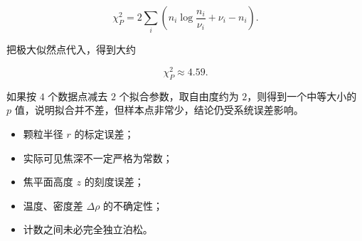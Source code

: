 \begin{question}
\begin{solution}
\begin{enumerate}
\[
\chi_P^2=2\sum_i\left(n_i\log\frac{n_i}{\nu_i}+\nu_i-n_i\right).
\]

把极大似然点代入，得到大约

\[
\chi_P^2\approx4.59.
\]

如果按 \(4\) 个数据点减去 \(2\) 个拟合参数，取自由度约为
\(2\)，则得到一个中等大小的 \(p\)
值，说明拟合并不差，但样本点非常少，结论仍受系统误差影响。


\begin{itemize}
\item
  颗粒半径 \(r\) 的标定误差；
\item
  实际可见焦深不一定严格为常数；
\item
  焦平面高度 \(z\) 的刻度误差；
\item
  温度、密度差 \(\Delta\rho\) 的不确定性；
\item
  计数之间未必完全独立泊松。
\end{itemize}
\end{enumerate}
\end{solution}
\end{question}

